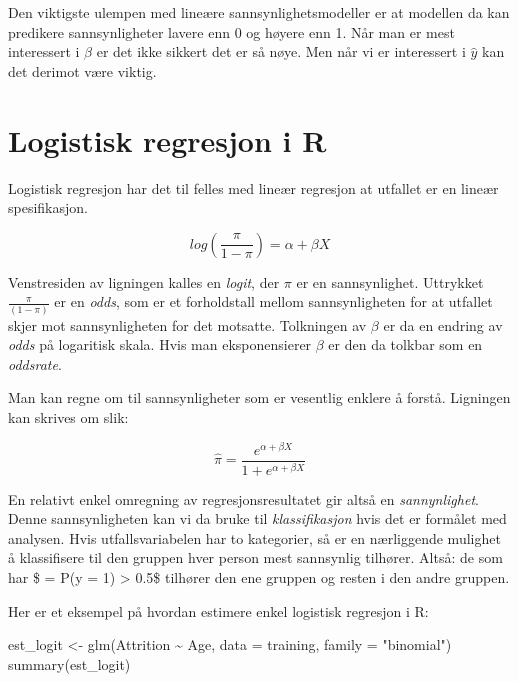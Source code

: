 \documentclass[
  letterpaper,
  DIV=11,
  numbers=noendperiod]{scrreprt}
\newenvironment{Shaded}{\begin{snugshade}}{\end{snugshade}}
\newcommand{\AttributeTok}[1]{\textcolor[rgb]{0.40,0.45,0.13}{#1}}
\newcommand{\FunctionTok}[1]{\textcolor[rgb]{0.28,0.35,0.67}{#1}}
\newcommand{\NormalTok}[1]{\textcolor[rgb]{0.00,0.23,0.31}{#1}}
\newcommand{\OtherTok}[1]{\textcolor[rgb]{0.00,0.23,0.31}{#1}}
\newcommand{\SpecialCharTok}[1]{\textcolor[rgb]{0.37,0.37,0.37}{#1}}
\newcommand{\StringTok}[1]{\textcolor[rgb]{0.13,0.47,0.30}{#1}}
\begin{document}
Den viktigste ulempen med lineære sannsynlighetsmodeller er at modellen
da kan predikere sannsynligheter lavere enn 0 og høyere enn 1. Når man
er mest interessert i \(\beta\) er det ikke sikkert det er så nøye. Men
når vi er interessert i \(\hat{y}\) kan det derimot være viktig.

\section{Logistisk regresjon i R}\label{logistisk-regresjon-i-r}

Logistisk regresjon har det til felles med lineær regresjon at utfallet
er en lineær spesifikasjon.

\[  log( \frac{\pi}{1-\pi}) = \alpha + \beta X \]

Venstresiden av ligningen kalles en \emph{logit}, der \(\pi\) er en
sannsynlighet. Uttrykket \(\frac{\pi}{(1-\pi)}\) er en \emph{odds}, som
er et forholdstall mellom sannsynligheten for at utfallet skjer mot
sannsynligheten for det motsatte. Tolkningen av \(\beta\) er da en
endring av \emph{odds} på logaritisk skala. Hvis man eksponensierer
\(\beta\) er den da tolkbar som en \emph{oddsrate}.

Man kan regne om til sannsynligheter som er vesentlig enklere å forstå.
Ligningen kan skrives om slik:

\[ \hat \pi = \frac{e^{\alpha + \beta X}}{1 + e^{\alpha + \beta X}} \]

En relativt enkel omregning av regresjonsresultatet gir altså en
\emph{sannynlighet}. Denne sannsynligheten kan vi da bruke til
\emph{klassifikasjon} hvis det er formålet med analysen. Hvis
utfallsvariabelen har to kategorier, så er en nærliggende mulighet å
klassifisere til den gruppen hver person mest sannsynlig tilhører.
Altså: de som har \$ \hat \pi = P(y = 1) \textgreater{} 0.5\$ tilhører
den ene gruppen og resten i den andre gruppen.

Her er et eksempel på hvordan estimere enkel logistisk regresjon i R:

\begin{Shaded}
\begin{Highlighting}[]
\NormalTok{est\_logit }\OtherTok{\textless{}{-}} \FunctionTok{glm}\NormalTok{(Attrition }\SpecialCharTok{\textasciitilde{}}\NormalTok{ Age, }\AttributeTok{data =}\NormalTok{ training, }\AttributeTok{family =} \StringTok{"binomial"}\NormalTok{)}
\FunctionTok{summary}\NormalTok{(est\_logit)}
\end{Highlighting}
\end{Shaded}
\end{document}

